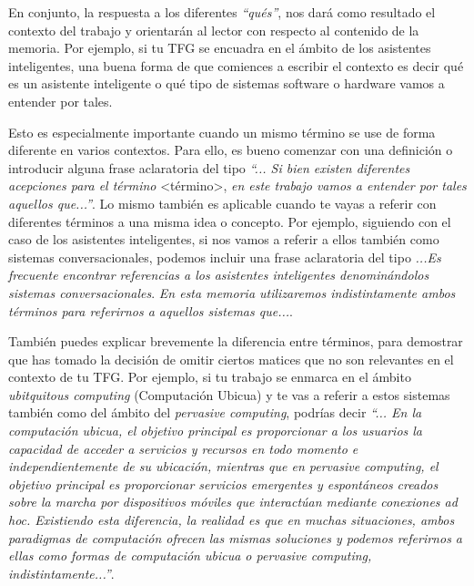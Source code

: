 En conjunto, la respuesta a los diferentes \textit{``qués''}, nos dará como resultado el contexto del trabajo y orientarán al lector con respecto al contenido de la memoria. Por ejemplo, si tu TFG se encuadra en el ámbito de los asistentes inteligentes, una buena forma de que comiences a escribir el contexto es decir qué es un asistente inteligente o qué tipo de sistemas software o hardware vamos a entender por tales.

Esto es especialmente importante cuando un mismo término se use de forma diferente en varios contextos. Para ello, es bueno comenzar con una definición o introducir alguna frase aclaratoria del tipo \textit{``... Si bien existen diferentes acepciones para el término} \textless término\textgreater, \textit{en este trabajo vamos a entender por tales aquellos que...''}. Lo mismo también es aplicable cuando te vayas a referir con diferentes términos a una misma idea o concepto. Por ejemplo, siguiendo con el caso de los asistentes inteligentes, si nos vamos a referir a ellos también como sistemas conversacionales, podemos incluir una frase aclaratoria del tipo \textit{...Es frecuente encontrar referencias a los asistentes inteligentes denominándolos sistemas conversacionales}. \textit{En esta memoria utilizaremos indistintamente ambos términos para referirnos a aquellos sistemas que...}.

También puedes explicar brevemente la diferencia entre términos, para demostrar que has tomado la decisión de omitir ciertos matices que no son relevantes en el contexto de tu TFG. Por ejemplo, si tu trabajo se enmarca en el ámbito \textit{ubitquitous computing} (Computación Ubicua) y te vas a referir a estos sistemas también como del ámbito del \textit{pervasive computing}, podrías decir \textit{``... En la computación ubicua, el objetivo principal es proporcionar a los usuarios la capacidad de acceder a servicios y recursos en todo momento e independientemente de su ubicación, mientras que en pervasive computing, el objetivo principal es proporcionar servicios emergentes y espontáneos creados sobre la marcha por dispositivos móviles que interactúan mediante conexiones ad hoc. Existiendo esta diferencia, la realidad es que en muchas situaciones, ambos paradigmas de computación ofrecen las mismas soluciones y podemos referirnos a ellas como formas de computación ubicua o pervasive computing, indistintamente...''}.

